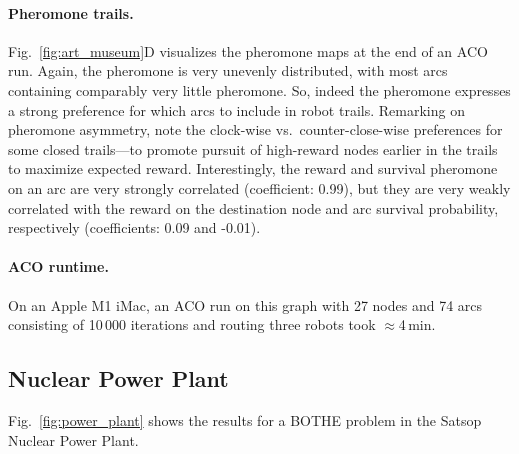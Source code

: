 \documentclass[fleqn,10pt,lineno]{wlpeerj}
\begin{document}
\paragraph{Pheromone trails.}
Fig.~\ref{fig:art_museum}D visualizes the pheromone maps at the end of an ACO run.
Again, the pheromone is very unevenly distributed, with most arcs containing comparably very little pheromone. So, indeed the pheromone expresses a strong preference for which arcs to include in robot trails.
Remarking on pheromone asymmetry, note the clock-wise vs.\ counter-close-wise preferences for some closed trails---to promote pursuit of high-reward nodes earlier in the trails to maximize expected reward.
Interestingly, the reward and survival pheromone on an arc are very strongly correlated (coefficient: 0.99), but they are very weakly correlated with the reward on the destination node and arc survival probability, respectively (coefficients: 0.09 and -0.01). 

\paragraph{ACO runtime.} On an Apple M1 iMac, an ACO run on this graph with 27 nodes and 74 arcs consisting of 10\,000 iterations and routing three robots took $\approx$4\,min.

\subsection{Nuclear Power Plant}
Fig.~\ref{fig:power_plant} shows the results for a BOTHE problem in the Satsop Nuclear Power Plant.
\end{document}
